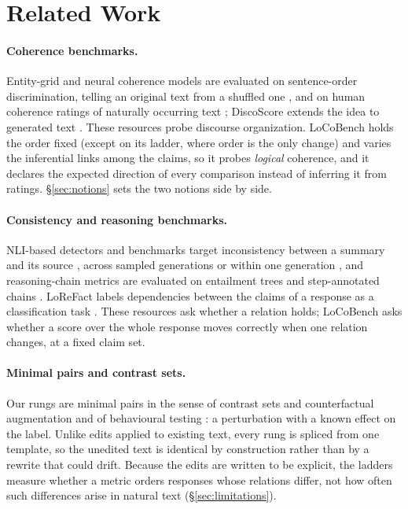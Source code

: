 \documentclass[11pt]{article}
\begin{document}


\section{Related Work}
\label{sec:related}

\paragraph{Coherence benchmarks.} Entity-grid and neural coherence models are evaluated on
sentence-order discrimination, telling an original text from a shuffled one \citep{barzilay,li},
and on human coherence ratings of naturally occurring text \citep{gcdc}; DiscoScore extends the
idea to generated text \citep{discoscore}. These resources probe discourse organization. LoCoBench
holds the order fixed (except on its  ladder, where order is the only change) and varies
the inferential links among the claims, so it probes \emph{logical} coherence, and it declares the
expected direction of every comparison instead of inferring it from ratings. \S\ref{sec:notions}
sets the two notions side by side.

\paragraph{Consistency and reasoning benchmarks.} NLI-based detectors and benchmarks target
inconsistency between a summary and its source \citep{summac,frank}, across sampled generations
\citep{selfcheckgpt} or within one generation \citep{mundler2024}, and reasoning-chain metrics are
evaluated on entailment trees and step-annotated chains \citep{entailmentbank,roscoe,receval}.
LoReFact labels dependencies between the claims of a response as a classification task
\citep{lorefact}. These resources ask whether a relation holds; LoCoBench asks whether a score
over the whole response moves correctly when one relation changes, at a fixed claim set.

\paragraph{Minimal pairs and contrast sets.} Our rungs are minimal pairs in the sense of contrast
sets and counterfactual augmentation \citep{contrastsets,kaushik2020} and of behavioural testing
\citep{checklist}: a perturbation with a known effect on the label. Unlike edits applied to
existing text, every rung is spliced from one template, so the unedited text is identical by
construction rather than by a rewrite that could drift. Because the edits are written to be
explicit, the ladders measure whether a metric orders responses whose relations differ, not how
often such differences arise in natural text (\S\ref{sec:limitations}).
\end{document}

